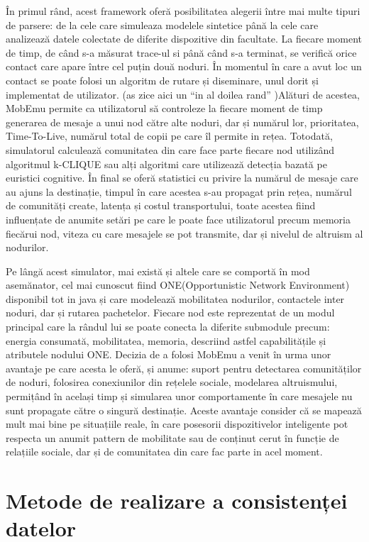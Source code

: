 \documentclass[12pt,a4paper]{report}
\begin{document}
În primul rând, acest framework oferă posibilitatea alegerii între mai multe tipuri de parsere: de la cele care simuleaza modelele sintetice până la cele care analizează datele colectate de diferite dispozitive din facultate. La fiecare moment de timp, de când s-a măsurat trace-ul si până când s-a terminat, se verifică orice contact care apare între cel puțin două noduri. În momentul în care a avut loc un contact se poate folosi un algoritm de rutare și diseminare, unul dorit și implementat de utilizator. 
(as zice aici un ``in al doilea rand'' )Alături de acestea, MobEmu permite ca utilizatorul să controleze la fiecare moment de timp generarea de mesaje a unui nod către alte noduri, dar și numărul lor, prioritatea, Time-To-Live, numărul total de copii pe care îl permite in rețea. Totodată, simulatorul calculează comunitatea din care face parte fiecare nod utilizând algoritmul k-CLIQUE sau alți algoritmi care utilizează detecția bazată pe euristici cognitive. 
În final se oferă statistici cu privire la numărul de mesaje care au ajuns la destinație, timpul în care acestea s-au propagat prin rețea, numărul de comunități create, latența și costul transportului, toate acestea fiind influențate de anumite setări pe care le poate face utilizatorul precum memoria fiecărui nod, viteza cu care mesajele se pot transmite, dar și nivelul de altruism al nodurilor.

Pe lângă acest simulator, mai există și altele care se comportă în mod asemănator, cel mai cunoscut fiind ONE(Opportunistic Network Environment)~\cite{OneArticle} disponibil tot in java și care modelează mobilitatea nodurilor, contactele inter noduri, dar și rutarea pachetelor. Fiecare nod este reprezentat de un modul principal care la rândul lui se poate conecta la diferite submodule precum: energia consumată, mobilitatea, memoria, descriind astfel capabilitățile și atributele nodului ONE. Decizia de a folosi MobEmu a venit în urma unor avantaje pe care acesta le oferă, și anume: suport pentru detectarea comunităților de noduri, folosirea conexiunilor din rețelele sociale, modelarea altruismului, permițând în același timp și simularea unor comportamente în care mesajele nu sunt propagate către o singură destinație. Aceste avantaje consider că se mapează mult mai bine pe situațiile reale, în care posesorii dispozitivelor inteligente pot respecta un anumit pattern de mobilitate sau de conținut cerut în funcție de relațiile sociale, dar și de comunitatea din care fac parte in acel moment.  


\section{Metode de realizare a consistenței datelor}
\end{document}
